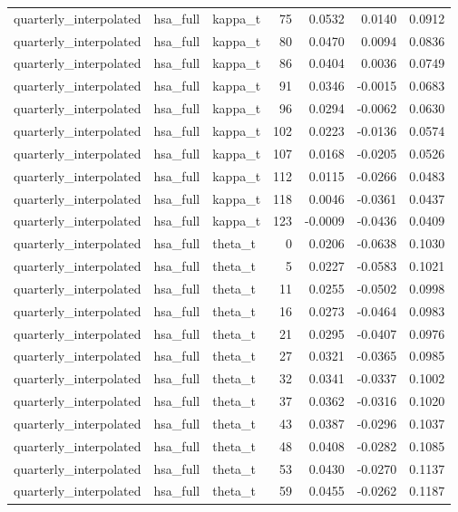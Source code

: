 \begin{tabular}{lllrrrr}
quarterly\_interpolated & hsa\_full & kappa\_t & 75 & 0.0532 & 0.0140 & 0.0912 \\
quarterly\_interpolated & hsa\_full & kappa\_t & 80 & 0.0470 & 0.0094 & 0.0836 \\
quarterly\_interpolated & hsa\_full & kappa\_t & 86 & 0.0404 & 0.0036 & 0.0749 \\
quarterly\_interpolated & hsa\_full & kappa\_t & 91 & 0.0346 & -0.0015 & 0.0683 \\
quarterly\_interpolated & hsa\_full & kappa\_t & 96 & 0.0294 & -0.0062 & 0.0630 \\
quarterly\_interpolated & hsa\_full & kappa\_t & 102 & 0.0223 & -0.0136 & 0.0574 \\
quarterly\_interpolated & hsa\_full & kappa\_t & 107 & 0.0168 & -0.0205 & 0.0526 \\
quarterly\_interpolated & hsa\_full & kappa\_t & 112 & 0.0115 & -0.0266 & 0.0483 \\
quarterly\_interpolated & hsa\_full & kappa\_t & 118 & 0.0046 & -0.0361 & 0.0437 \\
quarterly\_interpolated & hsa\_full & kappa\_t & 123 & -0.0009 & -0.0436 & 0.0409 \\
quarterly\_interpolated & hsa\_full & theta\_t & 0 & 0.0206 & -0.0638 & 0.1030 \\
quarterly\_interpolated & hsa\_full & theta\_t & 5 & 0.0227 & -0.0583 & 0.1021 \\
quarterly\_interpolated & hsa\_full & theta\_t & 11 & 0.0255 & -0.0502 & 0.0998 \\
quarterly\_interpolated & hsa\_full & theta\_t & 16 & 0.0273 & -0.0464 & 0.0983 \\
quarterly\_interpolated & hsa\_full & theta\_t & 21 & 0.0295 & -0.0407 & 0.0976 \\
quarterly\_interpolated & hsa\_full & theta\_t & 27 & 0.0321 & -0.0365 & 0.0985 \\
quarterly\_interpolated & hsa\_full & theta\_t & 32 & 0.0341 & -0.0337 & 0.1002 \\
quarterly\_interpolated & hsa\_full & theta\_t & 37 & 0.0362 & -0.0316 & 0.1020 \\
quarterly\_interpolated & hsa\_full & theta\_t & 43 & 0.0387 & -0.0296 & 0.1037 \\
quarterly\_interpolated & hsa\_full & theta\_t & 48 & 0.0408 & -0.0282 & 0.1085 \\
quarterly\_interpolated & hsa\_full & theta\_t & 53 & 0.0430 & -0.0270 & 0.1137 \\
quarterly\_interpolated & hsa\_full & theta\_t & 59 & 0.0455 & -0.0262 & 0.1187 \\

\end{tabular}
